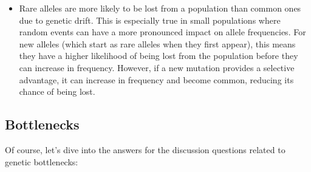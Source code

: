 \documentclass[
  a4paper]{book}
\providecommand{\tightlist}{%
  \setlength{\itemsep}{0pt}\setlength{\parskip}{0pt}}
\begin{document}
\begin{enumerate}
  \begin{itemize}
  \tightlist
  \item
    Rare alleles are more likely to be lost from a population than common ones due to genetic drift. This is especially true in small populations where random events can have a more pronounced impact on allele frequencies. For new alleles (which start as rare alleles when they first appear), this means they have a higher likelihood of being lost from the population before they can increase in frequency. However, if a new mutation provides a selective advantage, it can increase in frequency and become common, reducing its chance of being lost.
  \end{itemize}
\end{enumerate}

\hypertarget{bottlenecks-1}{%
\subsection{Bottlenecks}\label{bottlenecks-1}}

Of course, let's dive into the answers for the discussion questions related to genetic bottlenecks:
\end{document}
